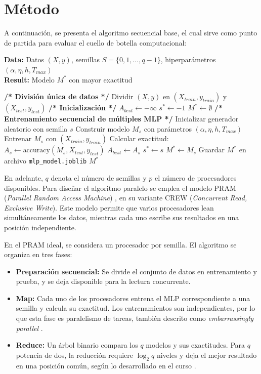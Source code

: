 \documentclass[11pt, a4paper]{article}
\begin{document}
\section{Método}

A continuación, se presenta el algoritmo secuencial base, el cual sirve como punto de partida para evaluar el cuello de botella computacional:

\begin{algorithm}[H]
\caption{Entrenamiento secuencial de múltiples MLP con distintas semillas}
\textbf{Data:} Datos $(X, y)$, semillas $S = \{0, 1, \dots, q - 1\}$, hiperparámetros $(\alpha, \eta, h, T_{max})$\\
\textbf{Result:} Modelo $M^*$ con mayor exactitud
\begin{algorithmic}[1]
\State \textbf{/* División única de datos */}
\State Dividir $(X, y)$ en $(X_{train}, y_{train})$ y $(X_{test}, y_{test})$
\State \textbf{/* Inicialización */}
\State $A_{best} \gets -\infty$
\State $s^* \gets -1$
\State $M^* \gets \emptyset$
\State \textbf{/* Entrenamiento secuencial de múltiples MLP */}
    \State Inicializar generador aleatorio con semilla $s$
    \State Construir modelo $M_s$ con parámetros $(\alpha, \eta, h, T_{max})$
    \State Entrenar $M_s$ con $(X_{train}, y_{train})$
    \State Calcular exactitud: $A_s \gets \text{accuracy}(M_s, X_{test}, y_{test})$
        \State $A_{best} \gets A_s$
        \State $s^* \gets s$
        \State $M^* \gets M_s$
    \EndIf
\EndFor
\State Guardar $M^*$ en archivo \texttt{mlp\_model.joblib}
\State \Return $M^*$
\end{algorithmic}
\end{algorithm}


En adelante, $q$ denota el número de semillas y $p$ el número de procesadores disponibles. Para diseñar el algoritmo paralelo se emplea el modelo PRAM (\textit{Parallel Random Access Machine}) \cite{jaja1992parallel}, en su variante CREW (\textit{Concurrent Read, Exclusive Write}). Este modelo permite que varios procesadores lean simultáneamente los datos, mientras cada uno escribe sus resultados en una posición independiente.

En el PRAM ideal, se considera un procesador por semilla. El algoritmo se organiza en tres fases:
\begin{itemize}
    \item \textbf{Preparación secuencial:} Se divide el conjunto de datos en entrenamiento y prueba, y se deja disponible para la lectura concurrente.
    \item \textbf{Map:} Cada uno de los procesadores entrena el MLP correspondiente a una semilla y calcula su exactitud. Los entrenamientos son independientes, por lo que esta fase es paralelismo de tareas, también descrito como \textit{embarrassingly parallel} \cite{farias2022parallelmlps}.
    \item \textbf{Reduce:} Un árbol binario compara los $q$ modelos y sus exactitudes. Para $q$ potencia de dos, la reducción requiere $\log_2 q$ niveles y deja el mejor resultado en una posición común, según lo desarrollado en el curso \cite{u2.2}.
\end{itemize}
\end{document}
